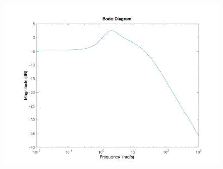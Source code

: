 \begin{itemize}
\begin{figure}[H]
		\includegraphics[width=12cm]{../Figure/Q1/Q1_c/t_bode.png}
	\end{figure}
\end{itemize}